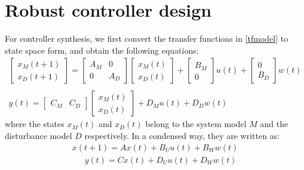 \documentclass[letterpaper, 10 pt, conference]{ieeeconf}  %
\begin{document}
  \section{Robust controller design}
  For controller synthesis, we first
  convert the transfer functions in \eqref{tfmodel} to state space form, and obtain the following equations:
  \begin{equation} 
  \begin{matrix}
  \begin{bmatrix}
  x_M(t+1) \\ x_D(t+1)
  \end{bmatrix} = 
  \begin{bmatrix}
  A_M & 0 \\ 0 & A_D
  \end{bmatrix}
  \begin{bmatrix}
  x_M(t) \\ x_D(t)
  \end{bmatrix} + 
  \begin{bmatrix}
  B_M \\ 0
  \end{bmatrix}
  u(t)+ 
  \begin{bmatrix}
  0 \\ B_D
  \end{bmatrix}
  w(t) \\ \\
  y(t) = 
  \begin{bmatrix}
  C_M & C_D
  \end{bmatrix}
  \begin{bmatrix}
  x_M(t) \\ x_D(t)
  \end{bmatrix}
  + D_Mu(t) + D_Dw(t) 
  \end{matrix}
  \label{ssmodel}
  \end{equation}
  where the states $x_M(t)$ and $x_D(t)$ belong to the system model $M$ and the disturbance model $D$ respectively. 
  In a condensed way, they are written as:
  \begin{equation}
  \begin{matrix}
    x(t+1)=Ax(t)+B_Uu(t)+B_Ww(t) \\
    \hspace{18pt} y(t)=Cx(t)+D_Uu(t)+D_Ww(t) 
    \end{matrix} 
        \label{ssmodel_condensed}
    \end{equation}
\end{document}
